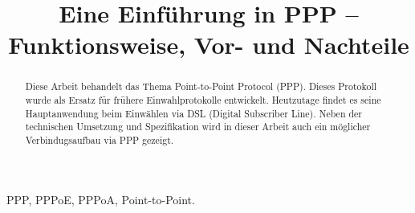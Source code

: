 \documentclass[journal,11pt]{IEEEtran}
\begin{document}
 
\title{Eine Einführung in PPP -- \\Funktionsweise, Vor- und Nachteile}
\author{
 }
\maketitle 
\begin{abstract} 
Diese Arbeit behandelt das Thema Point-to-Point Protocol (PPP). Dieses Protokoll wurde als Ersatz f\"ur fr\"uhere Einwahlprotokolle entwickelt. Heutzutage findet es seine Hauptanwendung beim Einw\"ahlen via DSL (Digital Subscriber Line). Neben der technischen Umsetzung und Spezifikation wird in dieser Arbeit auch ein m\"oglicher Verbindugsaufbau via PPP gezeigt.
\end{abstract} 
\begin{IEEEkeywords} 
PPP, PPPoE, PPPoA, Point-to-Point.
\end{IEEEkeywords}
\end{document}
